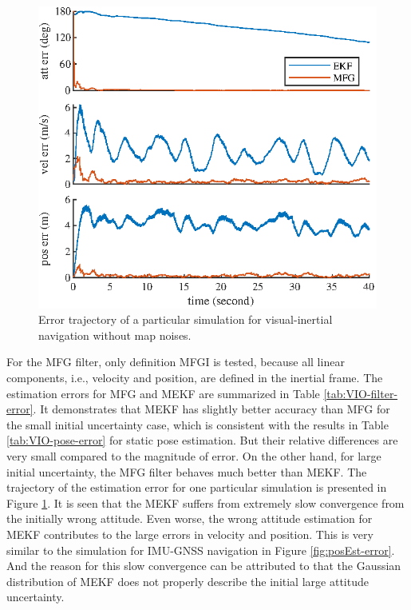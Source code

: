\begin{figure}
	\centering
	\includegraphics[scale=1.3]{figures/VIO-filter-error}
	\caption{Error trajectory of a particular simulation for visual-inertial navigation without map noises.}
	\label{fig:VIO-filter-error}
\end{figure}

For the MFG filter, only definition MFGI is tested, because all linear components, i.e., velocity and position, are defined in the inertial frame.
The estimation errors for MFG and MEKF are summarized in Table \ref{tab:VIO-filter-error}.
It demonstrates that MEKF has slightly better accuracy than MFG for the small initial uncertainty case, which is consistent with the results in Table \eqref{tab:VIO-pose-error} for static pose estimation.
But their relative differences are very small compared to the magnitude of error.
On the other hand, for large initial uncertainty, the MFG filter behaves much better than MEKF.
The trajectory of the estimation error for one particular simulation is presented in Figure \ref{fig:VIO-filter-error}.
It is seen that the MEKF suffers from extremely slow convergence from the initially wrong attitude.
Even worse, the wrong attitude estimation for MEKF contributes to the large errors in velocity and position.
This is very similar to the simulation for IMU-GNSS navigation in Figure \ref{fig:posEst-error}.
And the reason for this slow convergence can be attributed to that the Gaussian distribution of MEKF does not properly describe the initial large attitude uncertainty.

